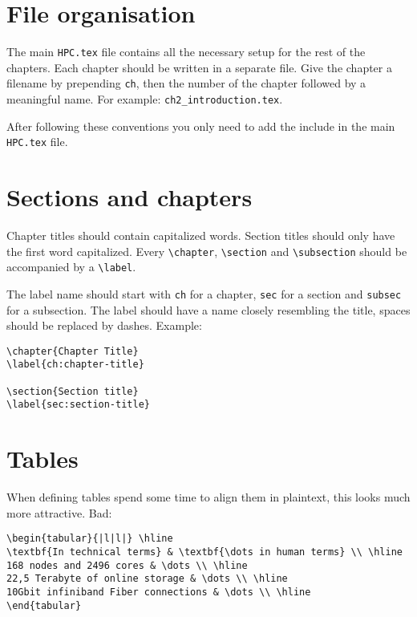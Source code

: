\documentclass[11pt,a4paper]{article}
\begin{document}
\section{File organisation}
\label{sec:file-organisation}

The main \texttt{HPC.tex} file contains all the necessary setup for the rest of
the chapters. Each chapter should be written in a separate file. Give the
chapter a filename by prepending \texttt{ch}, then the number of the chapter
followed by a meaningful name. For example: \texttt{ch2\_introduction.tex}.

After following these conventions you only need to add the include in the main
\texttt{HPC.tex} file.

\section{Sections and chapters}
\label{sec:sections-and-chapters}

Chapter titles should contain capitalized words. Section titles should only
have the first word capitalized.  Every \texttt{\textbackslash{}chapter},
\texttt{\textbackslash{}section} and \texttt{\textbackslash{}subsection} should
be accompanied by a \texttt{\textbackslash{}label}.

The label name should start with \texttt{ch} for a chapter, \texttt{sec} for a
section and \texttt{subsec} for a subsection. The label should have a name
closely resembling the title, spaces should be replaced by dashes. Example:

\begin{verbatim}
\chapter{Chapter Title}
\label{ch:chapter-title}

\section{Section title}
\label{sec:section-title}
\end{verbatim}

\section{Tables}
\label{sec:tables}

When defining tables spend some time to align them in plaintext, this looks much more attractive.
Bad:
\begin{verbatim}
\begin{tabular}{|l|l|} \hline
\textbf{In technical terms} & \textbf{\dots in human terms} \\ \hline
168 nodes and 2496 cores & \dots \\ \hline
22,5 Terabyte of online storage & \dots \\ \hline
10Gbit infiniband Fiber connections & \dots \\ \hline
\end{tabular}
\end{verbatim}
\end{document}
